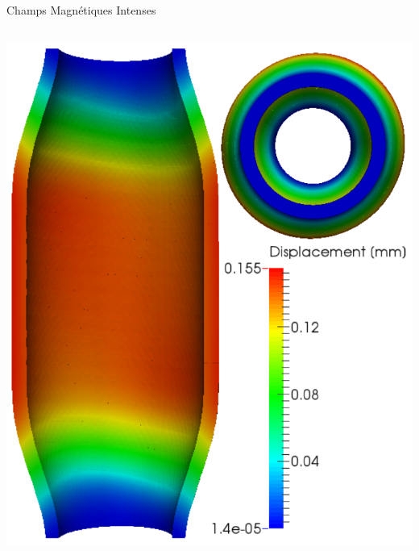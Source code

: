 \begin{frame}{Champs Magnétiques Intenses}
\begin{columns}[c]
    \includegraphics[height=.4\textheight]{Figures/cmi/Magnetmodels_bmap+dilat_HL31.png}

\end{columns}
\end{frame}
